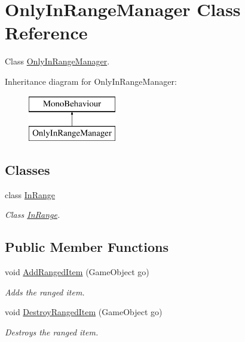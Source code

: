 \hypertarget{class_only_in_range_manager}{}\section{Only\+In\+Range\+Manager Class Reference}
\label{class_only_in_range_manager}


Class \hyperlink{class_only_in_range_manager}{Only\+In\+Range\+Manager}.  


Inheritance diagram for Only\+In\+Range\+Manager\+:\begin{figure}[H]
\begin{center}
\leavevmode
\includegraphics[height=2.000000cm]{class_only_in_range_manager}
\end{center}
\end{figure}
\subsection*{Classes}
\begin{DoxyCompactItemize}
\item 
class \hyperlink{class_only_in_range_manager_1_1_in_range}{In\+Range}
\begin{DoxyCompactList}\small\item\em Class \hyperlink{class_only_in_range_manager_1_1_in_range}{In\+Range}. \end{DoxyCompactList}\end{DoxyCompactItemize}
\subsection*{Public Member Functions}
\begin{DoxyCompactItemize}
\item 
void \hyperlink{class_only_in_range_manager_a2c52609beffc53211458f1118ebfb969}{Add\+Ranged\+Item} (Game\+Object go)
\begin{DoxyCompactList}\small\item\em Adds the ranged item. \end{DoxyCompactList}\item 
void \hyperlink{class_only_in_range_manager_aaf1f9303c9fc40e96d1ec9e55e3a9129}{Destroy\+Ranged\+Item} (Game\+Object go)
\begin{DoxyCompactList}\small\item\em Destroys the ranged item. \end{DoxyCompactList}\end{DoxyCompactItemize}
